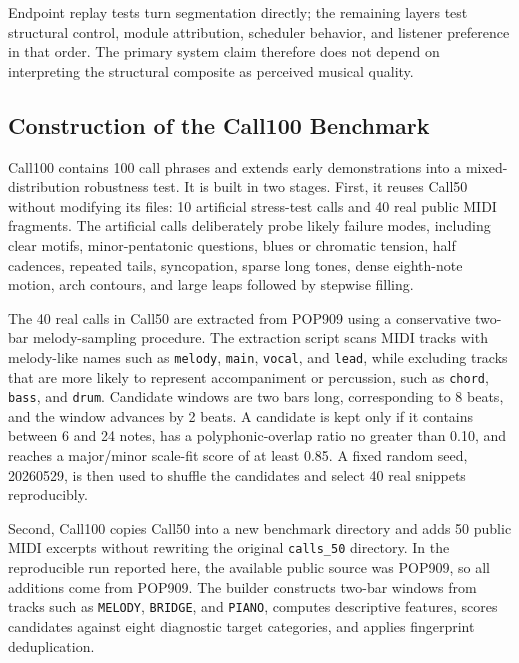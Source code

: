\documentclass[11pt,a4paper]{article}
\begin{document}
Endpoint replay tests turn segmentation directly; the remaining layers test structural control, module attribution, scheduler behavior, and listener preference in that order. The primary system claim therefore does not depend on interpreting the structural composite as perceived musical quality.

\subsection{Construction of the Call100 Benchmark}
\label{subsec:call100-dataset}

Call100 contains 100 call phrases and extends early demonstrations into a mixed-distribution robustness test. It is built in two stages. First, it reuses Call50 without modifying its files: 10 artificial stress-test calls and 40 real public MIDI fragments. The artificial calls deliberately probe likely failure modes, including clear motifs, minor-pentatonic questions, blues or chromatic tension, half cadences, repeated tails, syncopation, sparse long tones, dense eighth-note motion, arch contours, and large leaps followed by stepwise filling.

The 40 real calls in Call50 are extracted from POP909 \citep{wang2020pop909} using a conservative two-bar melody-sampling procedure. The extraction script scans MIDI tracks with melody-like names such as \texttt{melody}, \texttt{main}, \texttt{vocal}, and \texttt{lead}, while excluding tracks that are more likely to represent accompaniment or percussion, such as \texttt{chord}, \texttt{bass}, and \texttt{drum}. Candidate windows are two bars long, corresponding to 8 beats, and the window advances by 2 beats. A candidate is kept only if it contains between 6 and 24 notes, has a polyphonic-overlap ratio no greater than 0.10, and reaches a major/minor scale-fit score of at least 0.85. A fixed random seed, 20260529, is then used to shuffle the candidates and select 40 real snippets reproducibly.

Second, Call100 copies Call50 into a new benchmark directory and adds 50 public MIDI excerpts without rewriting the original \texttt{calls\_50} directory. In the reproducible run reported here, the available public source was POP909, so all additions come from POP909. The builder constructs two-bar windows from tracks such as \texttt{MELODY}, \texttt{BRIDGE}, and \texttt{PIANO}, computes descriptive features, scores candidates against eight diagnostic target categories, and applies fingerprint deduplication.
\end{document}
